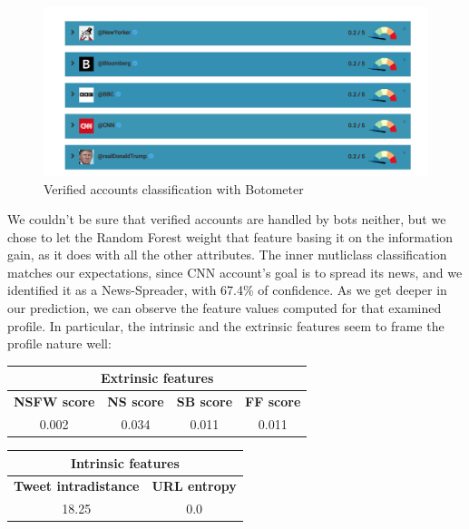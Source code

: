 \begin{figure}[htp!]
	\begin{center}
		\includegraphics[width=\columnwidth]{chapter7/figure/verified.png}\par
	\end{center}
	\caption{Verified accounts classification with Botometer}
	\label{fig:verified}
\end{figure}
We couldn't be sure that verified accounts are handled by bots neither, but we chose to let the Random Forest weight that feature basing it on the information gain, as it does with all the other attributes.
The inner mutliclass classification matches our expectations, since CNN account's goal is to spread its news, and we identified it as a News-Spreader, with 67.4\% of confidence.
As we get deeper in our prediction, we can observe the feature values computed for that examined profile. In particular, the intrinsic and the extrinsic features seem to frame the profile nature well:
\begin{center}
	\begin{tabular}{@{}c|c|c|c@{}}
		\multicolumn{4}{c}{Extrinsic features} \\
		\hline
		\multicolumn{1}{c|}{\textbf{NSFW score}} & 
		\multicolumn{1}{c|}{\textbf{NS score}} & 
		\multicolumn{1}{c|}{\textbf{SB score}} & 
		\multicolumn{1}{c}{\textbf{FF score}}\\
		\hline
		\multicolumn{1}{c|}{0.002} &
		\multicolumn{1}{c|}{0.034} &
		\multicolumn{1}{c|}{0.011} &
		\multicolumn{1}{c}{0.011} \\
		\hline
	\end{tabular}
\end{center}
\begin{center}
	\begin{tabular}{@{}c|c@{}}
		\multicolumn{2}{c}{Intrinsic features} \\
		\hline
		\multicolumn{1}{c|}{\textbf{Tweet intradistance}} & 
		\multicolumn{1}{c}{\textbf{URL entropy}}\\
		\hline
		\multicolumn{1}{c|}{18.25} &
		\multicolumn{1}{c}{0.0}\\
		\hline
	\end{tabular}
\end{center}

